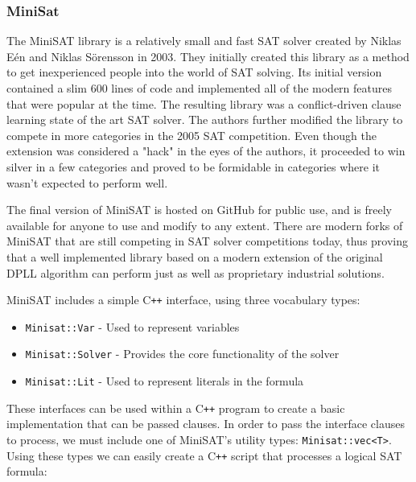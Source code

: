 \documentclass{article}
\begin{document}
    \subsubsection{MiniSat}
    The MiniSAT library is a relatively small and fast SAT solver created by Niklas Eén and Niklas Sörensson in 2003. They initially created
    this library as a method to get inexperienced people into the world of SAT solving. Its initial version contained a slim 600 lines of
    code and implemented all of the modern features that were popular at the time. The resulting library was a conflict-driven clause
    learning state of the art SAT solver. The authors further modified the library to compete in more categories in the 2005 SAT
    competition. Even though the extension was considered a "hack" in the eyes of the authors, it proceeded to win silver in a few
    categories and proved to be formidable in categories where it wasn't expected to perform well.

    The final version of MiniSAT is hosted on GitHub for public use, and is freely available for anyone to use and modify to any extent.
    There are modern forks of MiniSAT that are still competing in SAT solver competitions today, thus proving that a well implemented
    library based on a modern extension of the original DPLL algorithm can perform just as well as proprietary industrial solutions.

    MiniSAT includes a simple C\texttt{++} interface, using three vocabulary types:

    \begin{itemize}
        \item \texttt{Minisat::Var} - Used to represent variables
        \item \texttt{Minisat::Solver} - Provides the core functionality of the solver
        \item \texttt{Minisat::Lit} - Used to represent literals in the formula
    \end{itemize}

    These interfaces can be used within a C\texttt{++} program to create a basic implementation that can be passed clauses. In order to pass the
    interface clauses to process, we must include one of MiniSAT's utility types: \texttt{Minisat::vec<T>}. Using these types we can easily
    create a C\texttt{++} script that processes a logical SAT formula:
\end{document}
